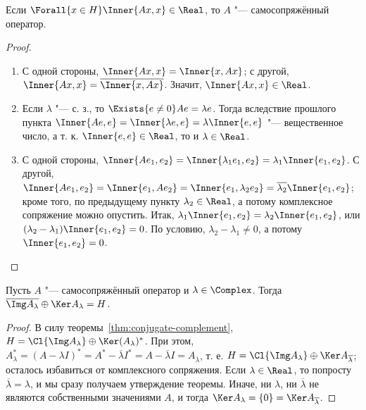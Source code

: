 \documentclass[main]{subfiles}
\begin{document}
\begin{exercise}
  Если \( \Forall{x \in H} \Inner{Ax, x} \in \Real \),
  то \( A \) "--- самосопряжённый оператор.
\end{exercise}

\begin{proof}~\begin{enumerate}
  \item С одной стороны, \( \Inner{Ax, x} = \Inner{x, Ax} \);
    с другой, \( \Inner{Ax, x} = \overline{\Inner{x, Ax}} \).
    Значит, \( \Inner{Ax, x} \in \Real \).
  \item Если \( \lambda \) "--- с. з., то
    \( \Exists{e \ne 0} Ae = \lambda e \).
    Тогда вследствие прошлого пункта
    \( \Inner{Ae, e} = \Inner{\lambda e, e} =
    \lambda \Inner{e, e} \) "---
    вещественное число, а т. к. \( \Inner{e, e} \in \Real \),
    то и \( \lambda \in \Real \).
  \item С одной стороны,
    \( \Inner{A e_1, e_2} = \Inner{\lambda_1 e_1, e_2} =
    \lambda_1 \Inner{e_1, e_2} \).
    С другой,
    \( \Inner{A e_1, e_2} = \Inner{e_1, A e_2} =
    \Inner{e_1, \lambda_2 e_2} =
    \overline{\lambda_2} \Inner{e_1, e_2} \);
    кроме того, по предыдущему пункту \( \lambda_2 \in \Real \),
    а потому комплексное сопряжение можно опустить.
    Итак, \( \lambda_1 \Inner{e_1, e_2} =
    \lambda_2 \Inner{e_1, e_2} \),
    или \( (\lambda_2 - \lambda_1) \Inner{e_1, e_2} = 0 \).
    По условию, \( \lambda_2 - \lambda_1 \ne 0 \),
    а потому \( \Inner{e_1, e_2} = 0 \).
\end{enumerate}\end{proof}

\begin{theorem}\label{thm:selfconjugate-complement}%
  Пусть \( A \) "--- самосопряжённый оператор и
  \( \lambda \in \Complex \).
  Тогда
  \( \overline{\Img A_\lambda} \oplus
  \Ker A_{\lambda} = H \).
\end{theorem}
\begin{proof}
  В силу теоремы~\ref{thm:conjugate-complement},
  \( H = \Cl{\Img A_\lambda} \oplus \Ker (A_\lambda)^* \).
  При этом,
  \( A_\lambda^* = (A - \lambda I)^* =
  A^* - \overline{\lambda} I^* =
  A - \overline{\lambda} I =
  A_{\overline{\lambda}} \),
  т. е. \( H = \Cl{\Img A_\lambda} \oplus \Ker A_{\overline{\lambda}} \);
  осталось избавиться от комплексного сопряжения.
  Если \( \lambda \in \Real \), то попросту
  \( \overline{\lambda} = \lambda \),
  и мы сразу получаем утверждение теоремы.
  Иначе, ни \( \lambda \),
  ни \( \overline{\lambda} \) не являются собственными
  значениями \( A \), и тогда
  \( \Ker A_\lambda = \{ 0 \} = \Ker A_{\overline\lambda} \).
\end{proof}
\end{document}

